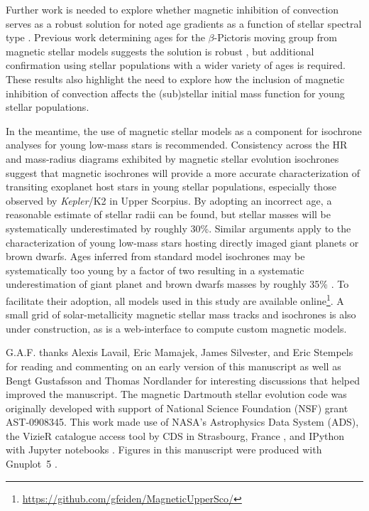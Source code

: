 \documentclass{aa}
\begin{document}
Further work is needed to explore whether magnetic inhibition of convection serves as a robust solution for noted age gradients as a function of stellar spectral type \citep[e.g.,][]{Naylor2009, Herczeg2015}. Previous work determining ages for the $\beta$-Pictoris moving group from magnetic stellar models suggests the solution is robust \citep{MM10, Malo2014, Binks2016}, but additional confirmation using stellar populations with a wider variety of ages is required. These results also highlight the need to explore how the inclusion of magnetic inhibition of convection affects the (sub)stellar initial mass function for young stellar populations.

In the meantime, the use of magnetic stellar models as a component for isochrone analyses for young low-mass stars is recommended. Consistency across the HR and mass-radius diagrams exhibited by magnetic stellar evolution isochrones suggest that magnetic isochrones will provide a more accurate characterization of transiting exoplanet host stars in young stellar populations, especially those observed by \emph{Kepler}/K2 in Upper Scorpius. By adopting an incorrect age, a reasonable estimate of stellar radii can be found, but stellar masses will be systematically underestimated by roughly 30\%. Similar arguments apply to the characterization of young low-mass stars hosting directly imaged giant planets or brown dwarfs. Ages inferred from standard model isochrones may be systematically too young by a factor of two resulting in a systematic underestimation of giant planet and brown dwarfs masses by roughly 35\% \citep{Baraffe2003}. To facilitate their adoption, all models used in this study are available online\footnote{\url{https://github.com/gfeiden/MagneticUpperSco/}}. A small grid of solar-metallicity magnetic stellar mass tracks and isochrones is also under construction, as is a web-interface to compute custom magnetic models.

\begin{acknowledgements}
G.A.F. thanks Alexis Lavail, Eric Mamajek, James Silvester, and Eric Stempels for reading and commenting on an early version of this manuscript as well as Bengt Gustafsson and Thomas Nordlander for interesting discussions that helped improved the manuscript. The magnetic Dartmouth stellar evolution code was originally developed with support of National Science Foundation (NSF) grant AST-0908345. This work made use of NASA's Astrophysics Data System (ADS), the VizieR catalogue access tool by CDS in Strasbourg, France \citep{Ochsenbein2000}, and IPython with Jupyter notebooks \citep{Perez2007}. Figures in this manuscript were produced with Gnuplot~5 \citep{Gnuplot5.0}.
\end{acknowledgements}
\end{document}
